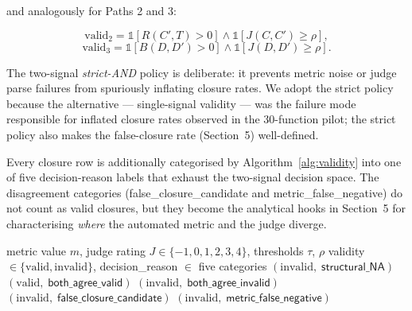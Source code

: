 and analogously for Paths 2 and 3:

\begin{equation}
  \text{valid}_2 = \mathds{1}[R(C', T) > 0] \wedge \mathds{1}[J(C, C') \geq \rho],
  \label{eq:valid2}
\end{equation}
\begin{equation}
  \text{valid}_3 = \mathds{1}[B(D, D') > 0] \wedge \mathds{1}[J(D, D') \geq \rho].
  \label{eq:valid3}
\end{equation}

The two-signal \emph{strict-AND} policy is deliberate: it prevents metric noise or judge parse failures from spuriously inflating closure rates. We adopt the strict policy because the alternative --- single-signal validity --- was the failure mode responsible for inflated closure rates observed in the 30-function pilot; the strict policy also makes the false-closure rate (Section~5) well-defined.

Every closure row is additionally categorised by Algorithm~\ref{alg:validity} into one of five decision-reason labels that exhaust the two-signal decision space. The disagreement categories (\textsf{false\_closure\_candidate} and \textsf{metric\_false\_negative}) do not count as valid closures, but they become the analytical hooks in Section~5 for characterising \emph{where} the automated metric and the judge diverge.

\begin{algorithm}[h]
\caption{Closure validity decision (implements Eq.~\ref{eq:valid1}--\ref{eq:valid3})}
\label{alg:validity}
\begin{algorithmic}[1]
\Require metric value $m$, judge rating $J \in \{-1, 0, 1, 2, 3, 4\}$, thresholds $\tau$, $\rho$
\Ensure validity $\in \{\text{valid}, \text{invalid}\}$, \textsf{decision\_reason} $\in$ five categories
  \State \Return $(\text{invalid},\; \textsf{structural\_NA})$ 
\EndIf
{}
  \State \Return $(\text{valid},\; \textsf{both\_agree\_valid})$
  \State \Return $(\text{invalid},\; \textsf{both\_agree\_invalid})$
  \State \Return $(\text{invalid},\; \textsf{false\_closure\_candidate})$ 
\Else {}
  \State \Return $(\text{invalid},\; \textsf{metric\_false\_negative})$ 
\EndIf
\end{algorithmic}
\end{algorithm}

